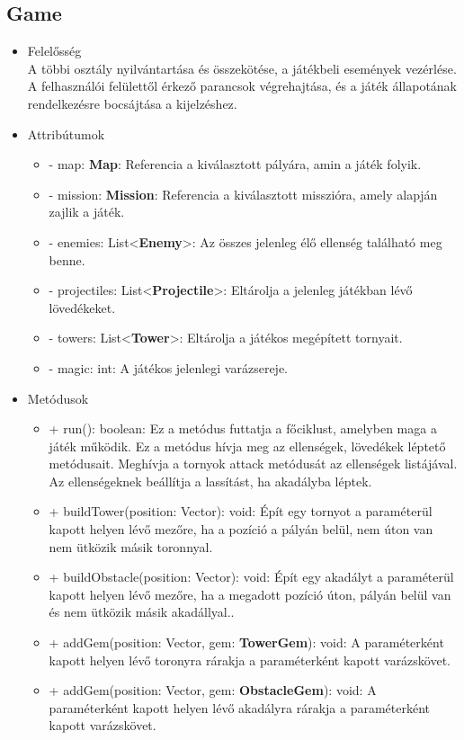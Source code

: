 \subsection{Game}
\begin{itemize}
\item Felelősség\\
A többi osztály nyilvántartása és összekötése, a játékbeli események vezérlése. A felhasználói felülettől érkező parancsok végrehajtása, és a játék állapotának rendelkezésre bocsájtása a kijelzéshez.
\item Attribútumok
	\begin{itemize}
		\item - map: \textbf{Map}: Referencia a kiválasztott pályára, amin a játék folyik.
		\item - mission: \textbf{Mission}: Referencia a kiválasztott misszióra, amely alapján zajlik a játék.
		\item - enemies: List<\textbf{Enemy}>: Az összes jelenleg élő ellenség található meg benne.
		\item - projectiles: List<\textbf{Projectile}>: Eltárolja a jelenleg játékban lévő lövedékeket.
		\item - towers: List<\textbf{Tower}>: Eltárolja a játékos megépített tornyait.
		\item - magic: int: A játékos jelenlegi varázsereje.
	\end{itemize}
\item Metódusok
	\begin{itemize}
		\item + run(): boolean: Ez a metódus futtatja a főciklust, amelyben maga a játék működik. Ez a metódus hívja meg az ellenségek, lövedékek léptető metódusait. Meghívja a tornyok attack metódusát az ellenségek listájával. Az ellenségeknek beállítja a lassítást, ha akadályba léptek.
		\item + buildTower(position: Vector): void: Épít egy tornyot a paraméterül kapott helyen lévő mezőre, ha a pozíció a pályán belül, nem úton van nem ütközik másik toronnyal.
		\item + buildObstacle(position: Vector): void: Épít egy akadályt a paraméterül kapott helyen lévő mezőre, ha a megadott pozíció úton, pályán belül van és nem ütközik másik akadállyal..
		\item + addGem(position: Vector, gem: \textbf{TowerGem}): void: A paraméterként kapott helyen lévő toronyra rárakja a paraméterként kapott varázskövet.
		\item + addGem(position: Vector, gem: \textbf{ObstacleGem}): void: A paraméterként kapott helyen lévő akadályra rárakja a paraméterként kapott varázskövet.

\end{itemize}
\end{itemize}
